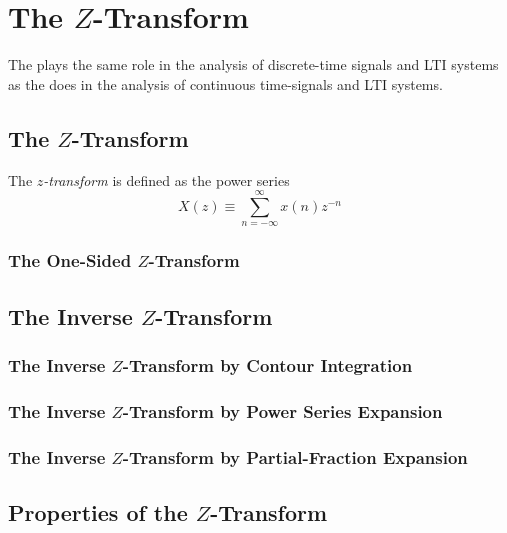 \section{The $Z$-Transform}\label{sec:Z-Transform}
The  plays the same role in the analysis of discrete-time signals and LTI systems as the  does in the analysis of continuous time-signals and LTI systems.

\subsection{The $Z$-Transform}\label{subsec:Z-Transform}
\begin{definition}[$Z$-Transform]\label{def:Z-Transform}
  The \emph{$z$-transform} is defined as the power series
  \begin{equation}\label{eq:Z-Transform}
    X(z) \equiv \sum_{n=-\infty}^{\infty} x(n)z^{-n}
  \end{equation}
\end{definition}

\subsubsection{The One-Sided $Z$-Transform}\label{subsubsec:One-Sided Z-Transform}
\subsection{The Inverse $Z$-Transform}\label{subsec:Inverse Z-Transform}
\subsubsection{The Inverse $Z$-Transform by Contour Integration}\label{subsubsec:Inverse Z-Transform by Contour Integration}
\subsubsection{The Inverse $Z$-Transform by Power Series Expansion}\label{subsubsec:Inverse Z-Transform by Power Series Expansion}
\subsubsection{The Inverse $Z$-Transform by Partial-Fraction Expansion}\label{subsubsec:Inverse Z-Transform by Partial-Fraction Expansion}
\subsection{Properties of the $Z$-Transform}\label{subsec:Z-Transform Properties}
\begin{propertylist}
\item 
\end{propertylist}

